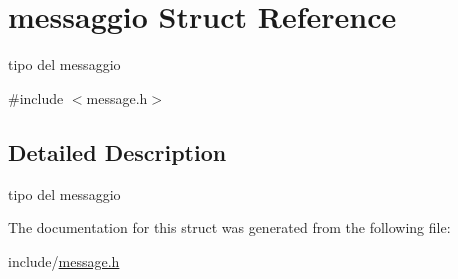 \hypertarget{structmessaggio}{}\section{messaggio Struct Reference}
\label{structmessaggio}


tipo del messaggio  




{\ttfamily \#include $<$message.\+h$>$}



\subsection{Detailed Description}
tipo del messaggio 

The documentation for this struct was generated from the following file\+:\begin{DoxyCompactItemize}
\item 
include/\hyperlink{message_8h}{message.\+h}\end{DoxyCompactItemize}
